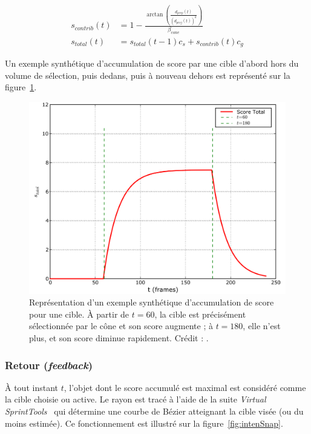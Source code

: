 	\begin{align}
		\label{eq:intensContrib}
		s_{contrib}(t) &= 1 - \frac{\arctan \left(\frac{d_{perp}(t)}{\left(d_{proj}(t)\right)^{k}}\right)}{\beta_{cone}} \\
		\label{eq:intensTotal}
		s_{total}(t) &= s_{total}(t-1)c_{s} + s_{contrib}(t)c_{g}
	\end{align}
	
	Un exemple synthétique d'accumulation de score par une cible d'abord hors du volume de sélection, puis dedans, puis à nouveau dehors est représenté sur la figure~\ref{fig:intensAccumul}.
	
	\begin{figure}[H]
		\centering
		\includegraphics[width=\textwidth]{figures/ch2/intensAccumul}
		\caption[\emph{IntenSelect} -- accumulation de score]{Représentation d'un exemple synthétique d'accumulation de score pour une cible. À partir de $t = 60$, la cible est précisément sélectionnée par le cône et son score augmente ; à $t = 180$, elle n'est plus, et son score diminue rapidement. Crédit : \cite{de2005intenselect}.}
		\label{fig:intensAccumul}
	\end{figure}
	
	\subsubsection{Retour (\emph{feedback})}
	À tout instant $t$, l'objet dont le score accumulé est maximal est considéré comme la cible choisie ou active. Le rayon est tracé à l'aide de la suite \emph{Virtual SprintTools}~\cite{koutek2001spring} qui détermine une courbe de Bézier atteignant la cible visée (ou du moins estimée). Ce fonctionnement est illustré sur la figure~\ref{fig:intenSnap}.
	
